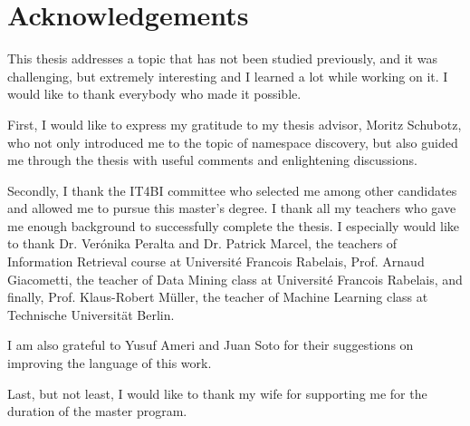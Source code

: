 \section*{Acknowledgements}

This thesis addresses a topic that has not been studied previously, and
it was challenging, but extremely interesting and I learned a lot while working
on it. I would like to thank everybody who made it possible.

First, I would like to express my gratitude to my thesis advisor, Moritz Schubotz, who not
only introduced me to the topic of namespace discovery, but also guided me through
the thesis with  useful comments and enlightening discussions.

Secondly, I thank the IT4BI committee who selected me among other candidates
and allowed me to pursue this master's degree.
I thank all my teachers who gave me enough background to
successfully complete the thesis. I especially would like to thank
Dr. Ver\'onika Peralta  and Dr. Patrick Marcel, the teachers of
Information Retrieval course at Universit\'e Francois Rabelais,
Prof. Arnaud Giacometti, the teacher of Data Mining class at Universit\'e Francois Rabelais,
and finally, Prof. Klaus-Robert M\"uller, the teacher of Machine Learning
class at Technische Universit\"at Berlin.

I am also grateful to Yusuf Ameri and Juan Soto for their suggestions on improving 
the language of this work. 

Last, but not least, I would like to thank my wife for supporting me for the duration
of the master program.
